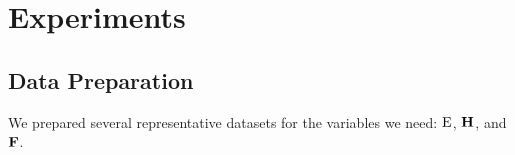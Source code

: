 \section{Experiments}

\subsection{Data Preparation}
We prepared several representative datasets for the variables we need: $\operatorname*{E}$, $\operatorname*{\mathbf{H}}$, and $\operatorname*{\mathbf{F}}$.